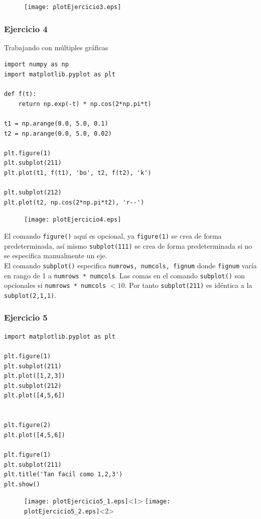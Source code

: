 \begin{frame}[fragile]
\begin{figure}
	\centering
	\texttt{[image: plotEjercicio3.eps]}
\end{figure}
\end{frame}
\begin{frame}[fragile]
\frametitle{Ejercicio 4}
Trabajando con múltiples gráficas
\begin{lstlisting}
import numpy as np
import matplotlib.pyplot as plt

def f(t):
    return np.exp(-t) * np.cos(2*np.pi*t)

t1 = np.arange(0.0, 5.0, 0.1)
t2 = np.arange(0.0, 5.0, 0.02)

plt.figure(1)
plt.subplot(211)
plt.plot(t1, f(t1), 'bo', t2, f(t2), 'k')

plt.subplot(212)
plt.plot(t2, np.cos(2*np.pi*t2), 'r--')
\end{lstlisting}
\end{frame}
\begin{frame}[fragile]
\begin{figure}
	\centering
	\texttt{[image: plotEjercicio4.eps]}
\end{figure}
\end{frame}
\begin{frame}
El comando \texttt{figure()} aquí es opcional, ya \texttt{figure(1)} se crea de forma predeterminada, así mismo \texttt{subplot(111)} se crea de forma predeterminada si no se especifica manualmente un eje.
\\
\medskip
El comando \texttt{subplot()} especifica \texttt{numrows, numcols, fignum} donde \texttt{fignum} varía en rango de 1 a \texttt{numrows * numcols}. Las comas en el comando \texttt{subplot()} son opcionales si \texttt{numrows * numcols} $<10$. Por tanto \texttt{subplot(211)} es idéntica a la \texttt{subplot(2,1,1)}.
\end{frame}
\begin{frame}[fragile]
\frametitle{Ejercicio 5}
\begin{lstlisting}
import matplotlib.pyplot as plt

plt.figure(1)                
plt.subplot(211)         
plt.plot([1,2,3])
plt.subplot(212)         
plt.plot([4,5,6])


plt.figure(2)                
plt.plot([4,5,6])           

plt.figure(1)                
plt.subplot(211)         
plt.title('Tan facil como 1,2,3')
plt.show()
\end{lstlisting}
\end{frame}
\begin{frame}[fragile]
\begin{figure}
	\centering
	\texttt{[image: plotEjercicio5\_1.eps]}<1>
	\texttt{[image: plotEjercicio5\_2.eps]}<2>
\end{figure}
\end{frame}
